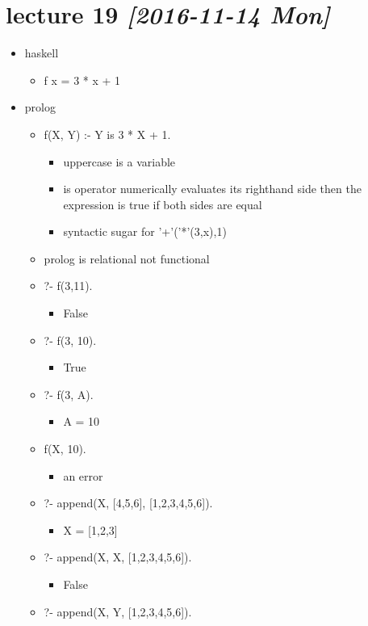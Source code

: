 \documentclass[11pt]{article}
\begin{document}
\section{lecture 19 \textit{[2016-11-14 Mon]}}
\label{sec-17}
\begin{itemize}
\item haskell
\begin{itemize}
\item f x = 3 * x + 1
\end{itemize}
\item prolog
\begin{itemize}
\item f(X, Y) :- Y is 3 * X + 1.
\begin{itemize}
\item uppercase is a variable
\item is operator numerically evaluates its righthand side then the expression is true if both sides are equal
\item syntactic sugar for '+'('*'(3,x),1)
\end{itemize}
\item prolog is relational not functional
\item ?- f(3,11).
\begin{itemize}
\item False
\end{itemize}
\item ?- f(3, 10).
\begin{itemize}
\item True
\end{itemize}
\item ?- f(3, A).
\begin{itemize}
\item A = 10
\end{itemize}
\item f(X, 10).
\begin{itemize}
\item an error
\end{itemize}
\item ?- append(X, [4,5,6], [1,2,3,4,5,6]).
\begin{itemize}
\item X = [1,2,3]
\end{itemize}
\item ?- append(X, X, [1,2,3,4,5,6]).
\begin{itemize}
\item False
\end{itemize}
\item ?- append(X, Y, [1,2,3,4,5,6]).

\end{itemize}
\end{itemize}
\end{document}
